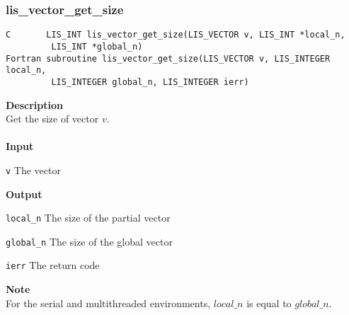 \documentclass[a4paper]{article}
\newcommand{\namelistlabel}[1]{\mbox{#1}\hfill}
\newenvironment{namelist}[1]{%
\begin{list}{}
  {\let\makelabel\namelistlabel
  \settowidth{\labelwidth}{#1}
  \setlength{\leftmargin}{1.1\labelwidth}}
  }{%
\end{list}}
\begin{document}
\subsubsection{lis\_vector\_get\_size}
\begin{screen}
\verb|C       LIS_INT lis_vector_get_size(LIS_VECTOR v, LIS_INT *local_n,|\\
\verb|         LIS_INT *global_n)|\\
\verb|Fortran subroutine lis_vector_get_size(LIS_VECTOR v, LIS_INTEGER local_n,|\\
\verb|         LIS_INTEGER global_n, LIS_INTEGER ierr)|
\end{screen}
{\bf Description}\\
\indent
Get the size of vector $v$.
\\ \\
\noindent
{\bf Input}
\begin{namelist}{XXXXXXXXXXXXXXXXXXXX}
\item[\tt v] The vector
\end{namelist}
{\bf Output}
\begin{namelist}{XXXXXXXXXXXXXXXXXXXX}
\item[\tt local\_n] The size of the partial vector
\item[\tt global\_n] The size of the global vector
\item[\tt ierr] The return code
\end{namelist}
{\bf Note}\\
\indent
For the serial and multithreaded environments, $local\_n$ is equal to $global\_n$. 
\end{document}
